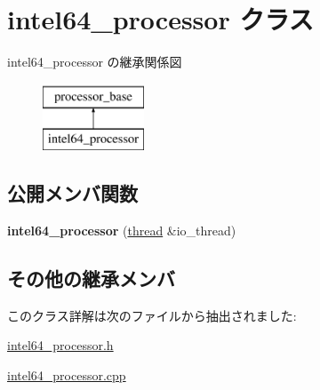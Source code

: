 \hypertarget{classintel64__processor}{}\section{intel64\+\_\+processor クラス}
\label{classintel64__processor}
intel64\+\_\+processor の継承関係図\begin{figure}[H]
\begin{center}
\leavevmode
\includegraphics[height=2.000000cm]{classintel64__processor}
\end{center}
\end{figure}
\subsection*{公開メンバ関数}
\begin{DoxyCompactItemize}
\item 
\hypertarget{classintel64__processor_af2c58d6afbd813bf3e3c0bf7061e1c12}{}{\bfseries intel64\+\_\+processor} (\hyperlink{classthread}{thread} \&io\+\_\+thread)\label{classintel64__processor_af2c58d6afbd813bf3e3c0bf7061e1c12}

\end{DoxyCompactItemize}
\subsection*{その他の継承メンバ}


このクラス詳解は次のファイルから抽出されました\+:\begin{DoxyCompactItemize}
\item 
\hyperlink{intel64__processor_8h}{intel64\+\_\+processor.\+h}\item 
\hyperlink{intel64__processor_8cpp}{intel64\+\_\+processor.\+cpp}\end{DoxyCompactItemize}
